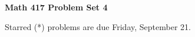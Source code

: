 \documentclass[12pt]{article}
\begin{document}
\def\ctln{\centerline}
\def\msk{\medskip}
\def\bsk{\bigskip}
\def\ssk{\smallskip}
\def\hsk{\hskip.3in}
\def\ra{\rightarrow}
\def\ubr{\underbar}

\def\mt{{\mathcal T}}
\def\mb{{\mathcal B}}
\def\ms{{\mathcal S}}
\def\mu{{\mathcal U}}
\def\mv{{\mathcal V}}

\def\bbr{{\mathbb R}}
\def\bbz{{\mathbb Z}}
\def\spc{$~$\hskip.15in$~$}

\def\sset{\subseteq}
\def\del{\partial}
\def\lra{$\Leftrightarrow$}
\def\bra{$\Rightarrow$}




\ctln{\bf Math 417 Problem Set 4}

\msk

Starred (*) problems are due Friday, September 21.
\end{document}
